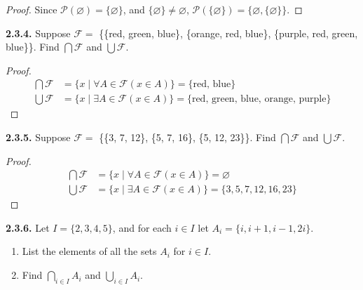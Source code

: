 \documentclass[12pt]{amsart}
\newenvironment{statement}[1]{\smallskip\noindent\color[rgb]{.6627, .3529, .6314} {\bf #1.}}{}
\theoremstyle{definition}
\theoremstyle{remark}
\begin{document}
\begin{proof}
Since $\mathscr{P}(\varnothing) = \{ \varnothing \}$,
and $\{ \varnothing \} \neq \varnothing$,
$\mathscr{P}(\{ \varnothing \}) = \{ \varnothing, \{ \varnothing \} \}$.
\end{proof}


\begin{statement}{2.3.4}
Suppose $\mathcal{F} =$ \{\{red, green, blue\}, \{orange, red, blue\}, \{purple, red, green, blue\}\}.
Find $\bigcap \mathcal{F}$ and $\bigcup \mathcal{F}$.
\end{statement}

\begin{proof}
\begin{align*}
	\bigcap \mathcal{F} &= \{ x \mid \forall A \in \mathcal{F} (x \in A) \} = \{ \text{red, blue} \} \\
	\bigcup \mathcal{F} &= \{ x \mid \exists A \in \mathcal{F} (x \in A) \} =
		\{ \text{red, green, blue, orange, purple} \}
\end{align*}
\end{proof}


\begin{statement}{2.3.5}
Suppose $\mathcal{F} =$ \{\{3, 7, 12\}, \{5, 7, 16\}, \{5, 12, 23\}\}.
Find $\bigcap \mathcal{F}$ and $\bigcup \mathcal{F}$.
\end{statement}

\begin{proof}
\begin{align*}
	\bigcap \mathcal{F} &= \{ x \mid \forall A \in \mathcal{F} (x \in A) \} = \varnothing \\
	\bigcup \mathcal{F} &= \{ x \mid \exists A \in \mathcal{F} (x \in A) \} =
		\{ 3, 5, 7, 12, 16, 23 \}
\end{align*}
\end{proof}


\begin{statement}{2.3.6}
Let $I = \{ 2, 3, 4, 5 \}$, and for each $i \in I$ let $A_i = \{ i, i + 1, i - 1, 2i \}$.
\begin{enumerate}
	\item List the elements of all the sets $A_i$ for $i \in I$.
	
	\item Find $\bigcap_{i \in I} A_i$ and $\bigcup_{i \in I} A_i$.
\end{enumerate}
\end{statement}
\end{document}
